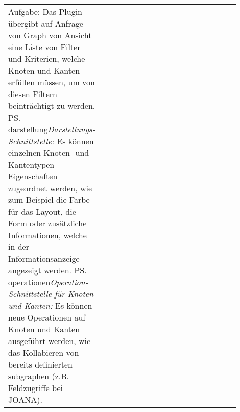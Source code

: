 \begin{tabular}{lp{0.9\linewidth}}
{    Aufgabe: Das Plugin übergibt auf Anfrage von Graph von Ansicht eine Liste von Filter und Kriterien, welche Knoten und Kanten erfüllen müssen, um von diesen Filtern beinträchtigt zu werden.}
  \ps{darstellung}{\textit{Darstellungs-Schnittstelle:} Es können einzelnen Knoten- und Kantentypen Eigenschaften zugeordnet werden, wie zum Beispiel die Farbe für das Layout, die Form oder zusätzliche Informationen, welche in der Informationsanzeige angezeigt werden.}
  \ps{operationen}{\textit{Operation-Schnittstelle für Knoten und Kanten:} Es können neue Operationen auf Knoten und Kanten ausgeführt werden, wie das Kollabieren von bereits definierten \gls{subgraph}en (z.B. Feldzugriffe bei JOANA).}
\end{tabular}
